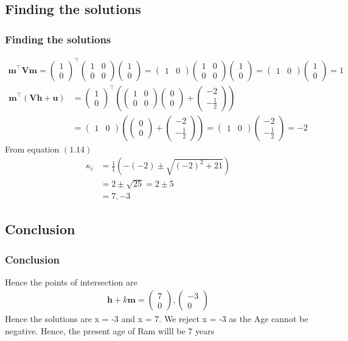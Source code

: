 \documentclass{beamer}
\providecommand{\brak}[1]{\ensuremath{\left(#1\right)}}
\theoremstyle{remark}
\newcommand{\myvec}[1]{\ensuremath{\begin{pmatrix}#1\end{pmatrix}}}
\let\vec\mathbf
\numberwithin{equation}{section}
\begin{document}
\begin{frame}
\subsection{Finding the solutions}
\frametitle{Finding the solutions}
  \begin{align}
     \vec{m}^\top \vec{V}\vec{m}=\myvec{1\\0}^\top\myvec{1&0\\0&0}\myvec{1\\0}=\myvec{1&0}\myvec{1&0\\0&0}\myvec{1\\0}=\myvec{1&0}\myvec{1\\0}=1
     \end{align}
 \begin{align}
    \vec{m}^\top\brak{\vec{V}\vec{h}+\vec{u}}
    &= \myvec{1\\0}^\top\brak{\myvec{1&0\\0&0}\myvec{0\\0}+\myvec{-2\\-\frac{1}{2}}} \nonumber \\&=\myvec{1&0}\brak{\myvec{0\\0}+\myvec{-2\\-\frac{1}{2}}}=
    \myvec{1&0}\myvec{-2\\-\frac{1}{2}}=-2
\end{align}
From equation \brak{1.14}
\begin{align}
\kappa_i&= \frac{1}{1}\brak{-\brak{-2}\pm\sqrt{\brak{-2}^2+21}}\\
&=2\pm\sqrt{25}=2\pm5 \\
&=7,-3
\end{align}
\end{frame}
\subsection{Conclusion}
\begin{frame}
\frametitle{Conclusion}
Hence the points of intersection are
\begin{align}
\vec{h}+k\vec{m}=\myvec{7\\0},\myvec{-3\\0}
\end{align}
Hence the solutions are x = -3 and x = 7. We reject
x = -3 as the Age cannot be negative. Hence, the present age of Ram willl be 7 years
\end{frame}
\end{document}
